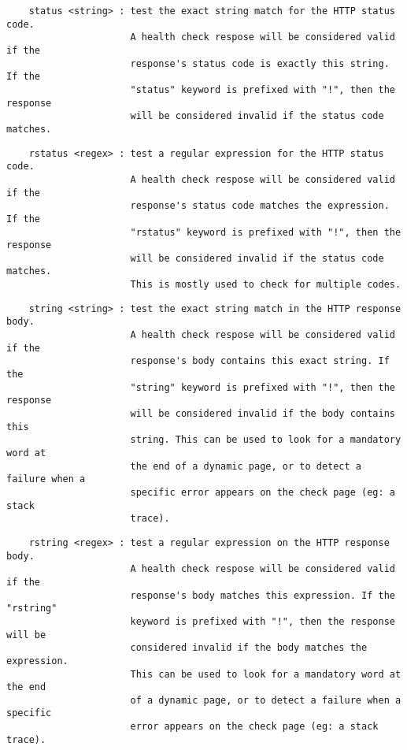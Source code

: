 \begin{verbatim}
    status <string> : test the exact string match for the HTTP status code.
                      A health check respose will be considered valid if the
                      response's status code is exactly this string. If the
                      "status" keyword is prefixed with "!", then the response
                      will be considered invalid if the status code matches.
\end{verbatim}

\begin{verbatim}
    rstatus <regex> : test a regular expression for the HTTP status code.
                      A health check respose will be considered valid if the
                      response's status code matches the expression. If the
                      "rstatus" keyword is prefixed with "!", then the response
                      will be considered invalid if the status code matches.
                      This is mostly used to check for multiple codes.
\end{verbatim}

\begin{verbatim}
    string <string> : test the exact string match in the HTTP response body.
                      A health check respose will be considered valid if the
                      response's body contains this exact string. If the
                      "string" keyword is prefixed with "!", then the response
                      will be considered invalid if the body contains this
                      string. This can be used to look for a mandatory word at
                      the end of a dynamic page, or to detect a failure when a
                      specific error appears on the check page (eg: a stack
                      trace).
\end{verbatim}

\begin{verbatim}
    rstring <regex> : test a regular expression on the HTTP response body.
                      A health check respose will be considered valid if the
                      response's body matches this expression. If the "rstring"
                      keyword is prefixed with "!", then the response will be
                      considered invalid if the body matches the expression.
                      This can be used to look for a mandatory word at the end
                      of a dynamic page, or to detect a failure when a specific
                      error appears on the check page (eg: a stack trace).
\end{verbatim}

